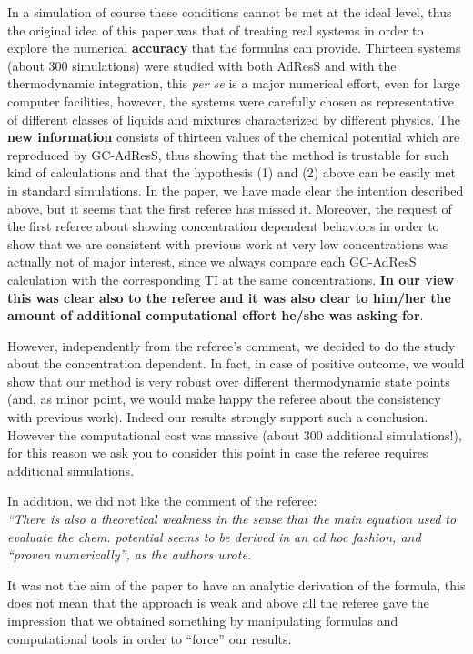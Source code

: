 \documentclass[12pt]{article}
\begin{document}
In a simulation of course these conditions cannot be met at the ideal level, thus the original idea of this paper was that of treating real systems in order to explore the numerical {\bf accuracy} that the formulas can provide. Thirteen systems (about 300 simulations) were studied with both AdResS and with the thermodynamic integration, this {\it per se} is a major numerical effort, even for large computer facilities, however, the systems were carefully chosen as representative of different classes of liquids and mixtures characterized by different physics. The {\bf new information} consists of thirteen values of the chemical potential which are reproduced by GC-AdResS, thus showing that the method is trustable for such kind of calculations and that the hypothesis (1) and (2) above can be easily met in standard simulations.
In the paper, we have made clear the intention described above, but it seems that the first referee has missed it.
Moreover, the request of the first referee about showing concentration dependent behaviors in order to show that we are consistent with previous work at very low concentrations was actually not of major interest, since we always compare each GC-AdResS calculation with the corresponding TI at the same concentrations. {\bf In our view this was clear also to the referee and it was also clear to him/her the amount of additional computational effort he/she was asking for}.

However, independently from the referee's comment, we decided to do the study about the concentration dependent. In fact, in case of positive outcome, we would show that our method is very robust over different thermodynamic state points (and, as minor point, we would make happy the referee about the consistency with previous work). Indeed our results strongly support such a conclusion. However the computational cost was massive (about 300 additional simulations!), for this reason we ask you to consider this point in case the referee requires additional simulations.

In addition, we did not like the comment of the referee:\\
{\color{blue}\it ``There is also a theoretical
  weakness in the sense that the main equation used to evaluate the chem. potential seems to be derived in an ad hoc fashion, and ``proven numerically'', as the authors wrote.}

It was not the aim of the paper to have an analytic derivation of the formula, this does not mean that the approach is weak and above all the referee gave the impression that we obtained something by manipulating formulas and computational tools in order to ``force'' our results.
\end{document}
